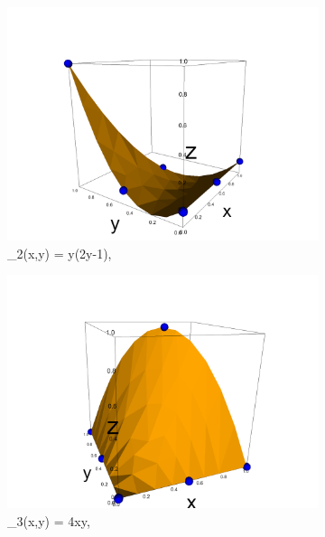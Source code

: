 \documentclass[12pt]{ociamthesis}
\begin{document}
\begin{figure}[H]
\begin{subfigure}{0.5\textwidth}
     \includegraphics[width=\textwidth]{Pics/BasisFunc/triBasis2.png}
     \caption{\phi_2(x,y) = y(2y-1),}
 \end{subfigure}
 \hfill
 \begin{subfigure}{0.5\textwidth}
     \includegraphics[width=\textwidth]{Pics/BasisFunc/triBasis3.png}
     \caption{\phi_3(x,y) = 4xy,}
 \end{subfigure}
 \hfill
 \begin{subfigure}{0.5\textwidth}

\end{subfigure}
\end{figure}
\end{document}
